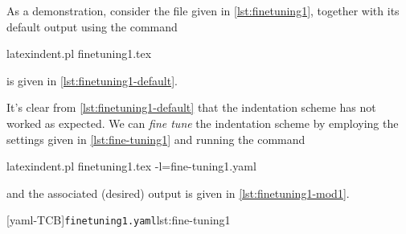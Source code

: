 \documentclass[10pt]{article}
\begin{document}
 \begin{example}
 As a demonstration, consider the file given in \cref{lst:finetuning1}, together with its
 default output using the command

 \begin{commandshell}
latexindent.pl finetuning1.tex 
\end{commandshell}

 is given in \cref{lst:finetuning1-default}.

 \begin{cmhtcbraster}[raster column skip=.01\linewidth]
 \end{cmhtcbraster}

 It's clear from \cref{lst:finetuning1-default} that the indentation scheme has not
 worked as expected. We can \emph{fine tune} the indentation scheme by employing the
 settings given in \cref{lst:fine-tuning1} and running the command 

 \begin{commandshell}
latexindent.pl finetuning1.tex -l=fine-tuning1.yaml
\end{commandshell}

 and the associated (desired) output is given in \cref{lst:finetuning1-mod1}.

 \begin{cmhtcbraster}[raster column skip=.01\linewidth]
  [yaml-TCB]{\texttt{finetuning1.yaml}}{lst:fine-tuning1}
 \end{cmhtcbraster}
 \end{example}
\end{document}
